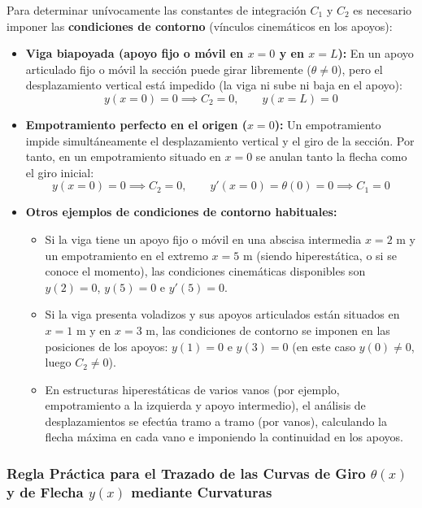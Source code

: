 Para determinar unívocamente las constantes de integración $C_1$ y $C_2$ es necesario imponer las \textbf{condiciones de contorno} (vínculos cinemáticos en los apoyos):
\begin{itemize}
    \item \textbf{Viga biapoyada (apoyo fijo o móvil en $x = 0$ y en $x = L$):} En un apoyo articulado fijo o móvil la sección puede girar libremente ($\theta \neq 0$), pero el desplazamiento vertical está impedido (la viga ni sube ni baja en el apoyo):
          \begin{equation}
              y(x = 0) = 0 \implies C_2 = 0, \qquad y(x = L) = 0
          \end{equation}
    \item \textbf{Empotramiento perfecto en el origen ($x = 0$):} Un empotramiento impide simultáneamente el desplazamiento vertical y el giro de la sección. Por tanto, en un empotramiento situado en $x = 0$ se anulan tanto la flecha como el giro inicial:
          \begin{equation}
              y(x = 0) = 0 \implies C_2 = 0, \qquad y'(x = 0) = \theta(0) = 0 \implies C_1 = 0
          \end{equation}
    \item \textbf{Otros ejemplos de condiciones de contorno habituales:}
          \begin{itemize}
              \item Si la viga tiene un apoyo fijo o móvil en una abscisa intermedia $x = 2\text{ m}$ y un empotramiento en el extremo $x = 5\text{ m}$ (siendo hiperestática, o si se conoce el momento), las condiciones cinemáticas disponibles son $y(2) = 0$, $y(5) = 0$ e $y'(5) = 0$.
              \item Si la viga presenta voladizos y sus apoyos articulados están situados en $x = 1\text{ m}$ y en $x = 3\text{ m}$, las condiciones de contorno se imponen en las posiciones de los apoyos: $y(1) = 0$ e $y(3) = 0$ (en este caso $y(0) \neq 0$, luego $C_2 \neq 0$).
              \item En estructuras hiperestáticas de varios vanos (por ejemplo, empotramiento a la izquierda y apoyo intermedio), el análisis de desplazamientos se efectúa tramo a tramo (por vanos), calculando la flecha máxima en cada vano e imponiendo la continuidad en los apoyos.
          \end{itemize}
\end{itemize}

\subsubsection{Regla Práctica para el Trazado de las Curvas de Giro $\theta(x)$ y de Flecha $y(x)$ mediante Curvaturas}

